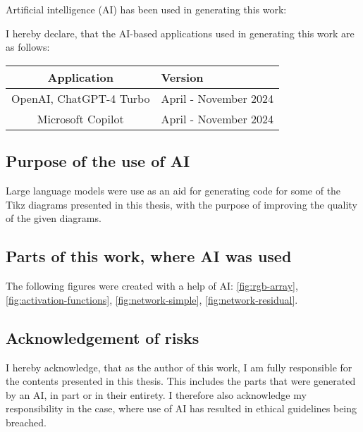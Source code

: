 \clearpage
\chapter*{\@aidisclaimertitle}
Artificial intelligence (AI) has been used in generating this work:


I hereby declare, that the AI-based applications used in generating this work are as follows:

\begin{center}
    \begin{tabular}{c|l}
        \toprule
        \textbf{Application} & \textbf{Version} \\
        \midrule
        OpenAI, ChatGPT-4 Turbo & April - November 2024 \\
        Microsoft Copilot & April - November 2024 \\
        \bottomrule
    \end{tabular}
\end{center}

\section*{Purpose of the use of AI}

Large language models were use as an aid for generating code for some of the Tikz diagrams presented in this thesis, with the purpose of improving the quality of the given diagrams.


\section*{Parts of this work, where AI was used}


The following figures were created with a help of AI: \ref{fig:rgb-array}, \ref{fig:activation-functions}, \ref{fig:network-simple}, \ref{fig:network-residual}.

\section*{Acknowledgement of risks}

I hereby acknowledge, that as the author of this work, I am fully
responsible for the contents presented in this thesis. This includes
the parts that were generated by an AI, in part or in their entirety. I
therefore also acknowledge my responsibility in the case, where use of
AI has resulted in ethical guidelines being breached.

\clearpage
